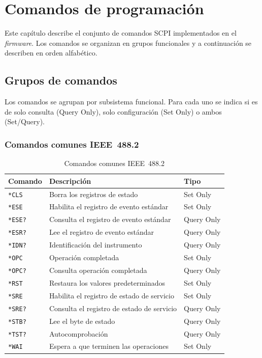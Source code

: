 \chapter{Comandos de programación}
\label{cp:scpi-commands}

Este capítulo describe el conjunto de comandos SCPI implementados en el \textit{firmware}. Los comandos se organizan en grupos funcionales y a continuación se describen en orden alfabético.

\section{Grupos de comandos}
\label{sec:cmd-groups}

Los comandos se agrupan por subsistema funcional. Para cada uno se indica si es de solo consulta (Query Only), solo configuración (Set Only) o ambos (Set/Query).

\subsection*{Comandos comunes IEEE~488.2}

\begin{table}[H]

    \caption{Comandos comunes IEEE~488.2}
    \label{tab:ieee488-group}
    \begin{tabular}{lll}
        \toprule
        \textbf{Comando} & \textbf{Descripción} & \textbf{Tipo} \\
        \midrule
        \texttt{*CLS}   & Borra los registros de estado               & Set Only \\
        \texttt{*ESE}   & Habilita el registro de evento estándar      & Set Only \\
        \texttt{*ESE?}  & Consulta el registro de evento estándar      & Query Only \\
        \texttt{*ESR?}  & Lee el registro de evento estándar           & Query Only \\
        \texttt{*IDN?}  & Identificación del instrumento               & Query Only \\
        \texttt{*OPC}   & Operación completada                         & Set Only \\
        \texttt{*OPC?}  & Consulta operación completada                & Query Only \\
        \texttt{*RST}   & Restaura los valores predeterminados         & Set Only \\
        \texttt{*SRE}   & Habilita el registro de estado de servicio   & Set Only \\
        \texttt{*SRE?}  & Consulta el registro de estado de servicio   & Query Only \\
        \texttt{*STB?}  & Lee el byte de estado                        & Query Only \\
        \texttt{*TST?}  & Autocomprobación                             & Query Only \\
        \texttt{*WAI}   & Espera a que terminen las operaciones        & Set Only \\
        \bottomrule
    \end{tabular}
\end{table}

